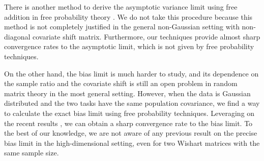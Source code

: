 


There is another method to derive the asymptotic variance limit using free addition in free probability theory \cite{nica2006lectures}. We do not take this procedure because this method is not completely justified in the general non-Gaussian setting with non-diagonal covariate shift matrix. 
Furthermore, our techniques provide almost sharp convergence rates to the asymptotic limit, which is not given by free probability techniques. 

On the other hand, the bias limit is much harder to study, and its dependence on the sample ratio and the covariate shift is still an open problem in random matrix theory in the most general setting. However, when the data is Gaussian distributed and the two tasks have the same population covariance, we find a way to calculate the exact bias limit using free probability techniques. Leveraging on the recent results \cite{BES_free1,BES_free2}, we can obtain a sharp convergence rate to the bias limit. To the best of our knowledge, we are not aware of any previous result on the precise bias limit in the high-dimensional setting, even for two Wishart matrices with the same sample size. 





